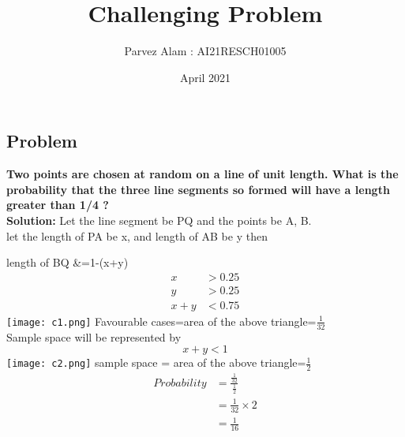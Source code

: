 \documentclass{article}
\title{Challenging Problem}
\author{Parvez Alam : AI21RESCH01005 }
\date{April 2021}
\begin{document}
\maketitle
\begin{multicols}{2}
\section{Problem}
\textbf{Two points are chosen at random on a line of unit length. What is the probability that the three line segments so formed will have a length greater than 1/4 ?} \\
\textbf{Solution: }
Let the line segment be PQ and the points be A, B. \\
let the length of PA be x, and length of AB be y then 

   length of BQ &=1-(x+y) 
\begin{align}
    x &>0.25 \nonumber \\
    y &>0.25 \nonumber \\
    x+y &<0.75 \nonumber 
\end{align}
\texttt{[image: c1.png]}
Favourable cases=area of the above triangle=\(\frac{1}{32}\)  \\ 
Sample space will be represented by
\[x+y<1\]
\texttt{[image: c2.png]}
sample space = area of the above triangle=\(\frac{1}{2}\) 
\begin{align}
    Probability &=\frac{\frac{1}{32}}{\frac{1}{2}} \nonumber\\
                &=\frac{1}{32}\times 2 \nonumber \\
                &=\frac{1}{16} \nonumber
\end{align}





\end{multicols}
\end{document}
